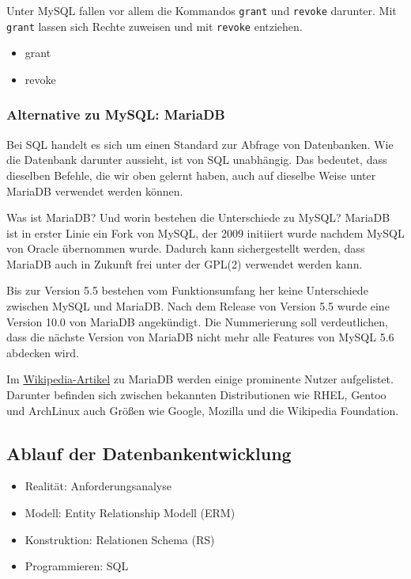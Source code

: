 Unter MySQL fallen vor allem die Kommandos \texttt{grant} und \texttt{revoke} darunter. Mit \texttt{grant} lassen sich Rechte zuweisen und mit \texttt{revoke} entziehen.

	\begin{itemize}
		\item grant
		\item revoke
	\end{itemize}

\subsubsection{Alternative zu MySQL: MariaDB}

Bei SQL handelt es sich um einen Standard zur Abfrage von Datenbanken. Wie die Datenbank darunter aussieht, ist von SQL unabhängig. Das bedeutet, dass dieselben Befehle, die wir oben gelernt haben, auch auf dieselbe Weise unter MariaDB verwendet werden können.

Was ist MariaDB? Und worin bestehen die Unterschiede zu MySQL? MariaDB ist in erster Linie ein Fork von MySQL, der 2009 initiiert wurde nachdem MySQL von Oracle übernommen wurde. Dadurch kann sichergestellt werden, dass MariaDB auch in Zukunft frei unter der GPL(2) verwendet werden kann.

Bis zur Version 5.5 bestehen vom Funktionsumfang her keine Unterschiede zwischen MySQL und MariaDB. Nach dem Release von Version 5.5 wurde eine Version 10.0 von MariaDB angekündigt. Die Nummerierung soll verdeutlichen, dass die nächste Version von MariaDB nicht mehr alle Features von MySQL 5.6 abdecken wird.

Im \href{http://en.wikipedia.org/wiki/MariaDB}{Wikipedia-Artikel} zu MariaDB werden einige prominente Nutzer aufgelistet. Darunter befinden sich zwischen bekannten Distributionen wie RHEL, Gentoo und ArchLinux auch Größen wie Google, Mozilla und die Wikipedia Foundation.


\subsection{Ablauf der Datenbankentwicklung}

\begin{itemize}
	\item Realität: Anforderungsanalyse
	\item Modell: Entity Relationship Modell (ERM)
	\item Konstruktion: Relationen Schema (RS)
	\item Programmieren: SQL
\end{itemize}


